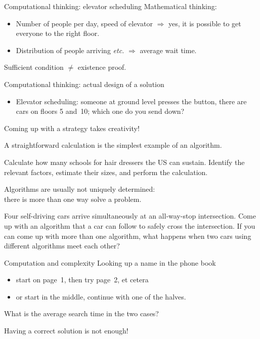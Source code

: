 \begin{block}{Computational thinking: elevator scheduling}
  \label{sl:elevator}
  Mathematical thinking:
  \begin{itemize}
  \item Number of people per day, speed of elevator $\Rightarrow$ yes,
    it is possible to get everyone to the right floor.
  \item Distribution of people arriving \emph{etc.} $\Rightarrow$
    average wait time.
  \end{itemize}
  Sufficient condition $\not=$ existence proof.

  Computational thinking: actual design of a solution
  \begin{itemize}
  \item Elevator scheduling: someone at ground level presses the
    button, there are cars on floors 5 and~10; which one do you send down?
  \end{itemize}
  Coming up with a strategy takes creativity!
\end{block}

\begin{exercise}
  \label{ex:hair}
  A straightforward calculation is the simplest example of an
  algorithm.

  Calculate how many schools for hair dressers the US can
  sustain. Identify the relevant factors, estimate their sizes, and
  perform the calculation.
\end{exercise}

\begin{exercise}
  \label{ex:googlecar}
  Algorithms are usually not uniquely determined:\\
  there is more than one way solve a problem.

  Four self-driving cars arrive simultaneously at an all-way-stop intersection. Come
  up with an algorithm that a car can follow to safely cross the
  intersection. If you can come up with more than one algorithm, what
  happens when two cars using different algorithms meet each other?
\end{exercise}

\begin{block}{Computation and complexity}
  \label{sl:phonebook}
  Looking up a name in the phone book
  \begin{itemize}
  \item start on page~1, then try page~2, et cetera
  \item or start in the middle, continue with one of the halves.
  \end{itemize}
  What is the average search time in the two cases?

  Having a  correct solution is not enough!
\end{block}

